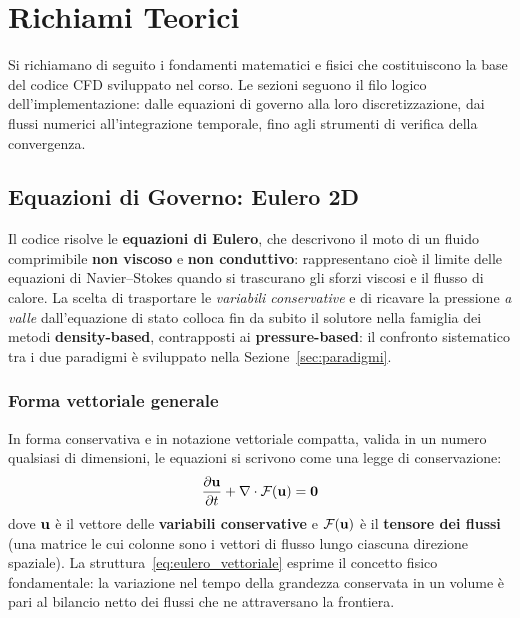 
\chapter{Richiami Teorici}

Si richiamano di seguito i fondamenti matematici e fisici che costituiscono la base
del codice CFD sviluppato nel corso.
Le sezioni seguono il filo logico dell'implementazione: dalle equazioni di governo
alla loro discretizzazione, dai flussi numerici all'integrazione temporale,
fino agli strumenti di verifica della convergenza.

\section{Equazioni di Governo: Eulero 2D}

Il codice risolve le \textbf{equazioni di Eulero}, che descrivono il moto di un
fluido comprimibile \textbf{non viscoso} e \textbf{non conduttivo}: rappresentano
cioè il limite delle equazioni di Navier--Stokes quando si trascurano gli sforzi
viscosi e il flusso di calore.
La scelta di trasportare le \emph{variabili conservative} e di ricavare la pressione
\emph{a valle} dall'equazione di stato colloca fin da subito il solutore nella famiglia
dei metodi \textbf{density-based}, contrapposti ai \textbf{pressure-based}: il confronto
sistematico tra i due paradigmi è sviluppato nella Sezione~\ref{sec:paradigmi}.

\subsection{Forma vettoriale generale}

In forma conservativa e in notazione vettoriale compatta, valida in un numero
qualsiasi di dimensioni, le equazioni si scrivono come una legge di conservazione:
\begin{equation}
  \dfrac{\partial \mathbf{u}}{\partial t} + \nabla \cdot \mathcal{F}(\mathbf{u}) = \bm{0}
  \label{eq:eulero_vettoriale}
\end{equation}
dove $\mathbf{u}$ è il vettore delle \textbf{variabili conservative} e
$\mathcal{F}(\mathbf{u})$ è il \textbf{tensore dei flussi} (una matrice le cui colonne
sono i vettori di flusso lungo ciascuna direzione spaziale).
La struttura~\eqref{eq:eulero_vettoriale} esprime il concetto fisico fondamentale:
la variazione nel tempo della grandezza conservata in un volume è pari al bilancio
netto dei flussi che ne attraversano la frontiera.

